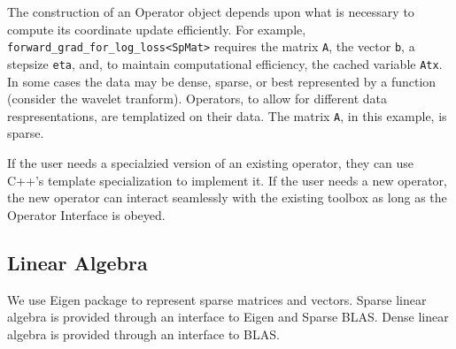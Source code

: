 The construction of an Operator object depends upon what is necessary to compute its coordinate update efficiently.
For example, \texttt{forward\_grad\_for\_log\_loss<SpMat>} requires the matrix \texttt{A}, the vector \texttt{b}, a stepsize \texttt{eta},  and, to maintain computational efficiency, the cached variable \texttt{Atx}.
In some cases the data may be dense, sparse, or best represented by a function (consider the wavelet tranform).
Operators, to allow for different data respresentations, are templatized on their data.
The matrix \texttt{A}, in this example, is sparse.

If the user needs a specialzied version of an existing operator, they can use C++'s template specialization to implement it.
If the user needs a new operator,  the new operator can interact seamlessly with the existing toolbox as long as the Operator Interface is obeyed.





\subsection{Linear Algebra}

We use Eigen package to represent sparse matrices and vectors. 
Sparse linear algebra is provided through an interface to Eigen and Sparse BLAS.
Dense linear algebra is provided through an interface to BLAS. 







